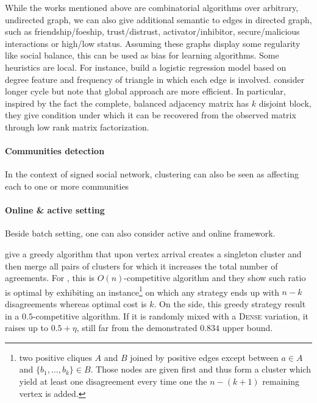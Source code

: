 While the works mentioned above are combinatorial algorithms over arbitrary,
undirected graph, we can also give additional semantic to edges in directed
graph, such as friendship/foeship, trust/distrust, activator/inhibitor,
secure/malicious interactions or high/low status. Assuming these graphs
display some regularity like social balance, this can be used as bias for
learning algorithms. Some heuristics are local. For instance,
\textcite{Leskovec2010} build a logistic regression model based on degree
feature and frequency of triangle in which each edge is involved.
\Textcite{LowRankCompletion14} consider longer cycle but note that global
approach are more efficient. In particular, inspired by the fact the complete,
balanced adjacency matrix has $k$ disjoint block, they give condition under
which it can be recovered from the observed matrix through low rank matrix
factorization.

\paragraph{Communities detection}
In the context of signed social network, clustering can also be seen as
affecting each to one or more communities
\autocites{Yang2007}{Traag2009}{Doreian2009}{Anchuri2012}{Amelio2013}{Chen14}{Jiang2015}


\paragraph{Online \& active setting}
Beside batch setting, one can also consider active
\autocites{Cesa-Bianchi2012b}{Cesa-Bianchi2012a} and online
\autocite{Gentile2013} framework.

\Textcite{mathieu:inria-00455771} give a greedy algorithm that upon vertex
arrival creates a singleton cluster and then merge all pairs of clusters for
which it increases the total number of agreements. For \mind{}, this is
$O(n)$-competitive algorithm and they show such ratio is optimal by exhibiting
an instance\footnote{two positive cliques $A$ and $B$ joined by positive edges
except between $a\in A$ and $\{b_1,\ldots, b_k\}\in B$. Those nodes are given
first and thus form a cluster which yield at least one disagreement every time
one the $n-(k+1)$ remaining vertex is added.} on which any strategy ends up with $n - k$
disagreements whereas optimal cost is $k$. On the \maxa{} side, this greedy
strategy result in a $0.5$-competitive algorithm. If it is randomly mixed with
a \textsc{Dense} variation, it raises up to $0.5+\eta$, still far from the
demonstrated $0.834$ upper bound.

